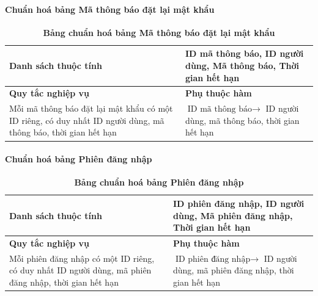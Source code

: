 \paragraph{Chuẩn hoá bảng Mã thông báo đặt lại mật khẩu}
\mbox{}

\begin{table}[H]
  \caption{\bfseries \fontsize{12pt}{0pt}\selectfont Bảng chuẩn hoá bảng Mã thông báo đặt lại mật khẩu}
  \centering
  \begin{tabularx}{0.9\textwidth}{|X|X|}
    \hline
    \textbf{Danh sách thuộc tính} & ID mã thông báo, ID người dùng, Mã thông báo,
    Thời gian hết hạn \\ %
    \hline
    \textbf{Quy tắc nghiệp vụ} & \textbf{Phụ thuộc hàm} \\
    \hline
    Mỗi mã thông báo đặt lại mật khẩu có một ID riêng, có duy nhất ID người dùng, mã thông báo,
    thời gian hết hạn & \parbox[t]{\linewidth}{$\text{ID mã thông báo} \rightarrow$ ID người dùng, mã thông báo,
    thời gian hết hạn} \\
    \hline
     \\
     \\
    \hline
  \end{tabularx}
\end{table}


\paragraph{Chuẩn hoá bảng Phiên đăng nhập}
\mbox{}

\begin{table}[H]
  \caption{\bfseries \fontsize{12pt}{0pt}\selectfont Bảng chuẩn hoá bảng Phiên đăng nhập}
  \centering
  \begin{tabularx}{0.9\textwidth}{|X|X|}
    \hline
    \textbf{Danh sách thuộc tính} & ID phiên đăng nhập, ID người dùng, Mã phiên đăng nhập, Thời
    gian hết hạn \\ %
    \hline
    \textbf{Quy tắc nghiệp vụ} & \textbf{Phụ thuộc hàm} \\
    \hline
    Mỗi phiên đăng nhập có một ID riêng, có duy nhất ID người dùng, mã phiên đăng nhập, thời
    gian hết hạn & \parbox[t]{\linewidth}{$\text{ID phiên đăng nhập} \rightarrow$ ID người dùng, mã phiên đăng nhập, thời
    gian hết hạn} \\
    \hline
     \\
     \\
    \hline
  \end{tabularx}
\end{table}



